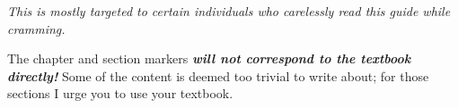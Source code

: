 \documentclass[../main.tex]{subfiles}
\begin{document}
\textit{This is mostly targeted to certain individuals who carelessly read this guide while cramming.}

\enumerate

\item The chapter and section markers \textbf{\textit{will not correspond to the textbook directly!}} Some of the content is deemed too trivial to write about; for those sections I urge you to use your textbook.

\item 

\endenumerate
\end{document}
